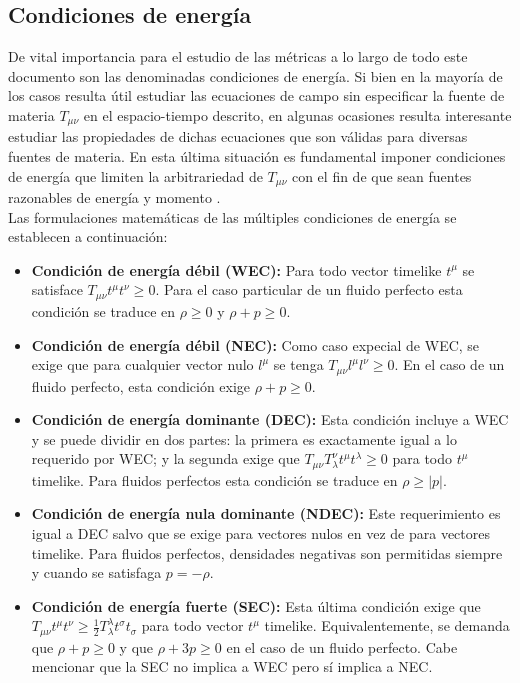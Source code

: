 \documentclass[prb,aps,preprintnumbers,amsmath,amssymb]{article}
\numberwithin{equation}{section}
\begin{document}
\subsection{Condiciones de energía}

De vital importancia para el estudio de las métricas a lo largo de todo este documento son las denominadas condiciones de energía. Si bien en la mayoría de los casos resulta útil estudiar las ecuaciones de campo sin especificar la fuente de materia $T_{\mu \nu}$ en el espacio-tiempo descrito, en algunas ocasiones resulta interesante estudiar las propiedades de dichas ecuaciones que son válidas para diversas fuentes de materia. En esta última situación es fundamental imponer condiciones de energía que limiten la arbitrariedad de $T_{\mu \nu}$ con el fin de que sean fuentes razonables de energía y momento \cite{carroll book}.\\

Las formulaciones matemáticas de las múltiples  condiciones de energía se establecen a continuación:

\begin{itemize}
\item \textbf{Condición de energía débil (WEC):} Para todo vector timelike $t^\mu$ se satisface $T_{\mu \nu}t^{\mu}t^{\nu} \geq 0$. Para el caso particular de un fluido perfecto esta condición se traduce en $\rho \geq 0$ y $\rho + p \geq 0$.

\item \textbf{Condición de energía débil (NEC):} Como caso expecial de WEC, se exige que para cualquier vector nulo $l^\mu$ se tenga $T_{\mu \nu}l^{\mu}l^{\nu} \geq 0$. En el caso de un fluido perfecto, esta condición exige $\rho + p \geq 0$.

\item \textbf{Condición de energía dominante (DEC):} Esta condición incluye a WEC y se puede dividir en dos partes: la primera es exactamente igual a lo requerido por WEC; y la segunda exige que $T_{\mu \nu}T^{\nu}_{\lambda}t^{\mu}t^{\lambda} \geq 0$ para todo $t^{\mu}$ timelike. Para fluidos perfectos esta condición se traduce en $\rho \geq |p|$.

\item \textbf{Condición de energía nula dominante (NDEC):} Este requerimiento es igual a DEC salvo que se exige para vectores nulos en vez de para vectores timelike. Para fluidos perfectos, densidades negativas son permitidas siempre y cuando se satisfaga $p = -\rho$.

\item \textbf{Condición de energía fuerte (SEC):} Esta última condición exige que $T_{\mu \nu}t^{\mu}t^{\nu} \geq \frac{1}{2}T^{\lambda}_{\lambda}t^{\sigma}t_{\sigma}$ para todo vector $t^\mu$ timelike. Equivalentemente, se demanda que $\rho + p \geq 0$ y que $\rho + 3p \geq 0$ en el caso de un fluido perfecto. Cabe mencionar que la SEC no implica a WEC pero sí implica a NEC.
\end{itemize}
\end{document}
